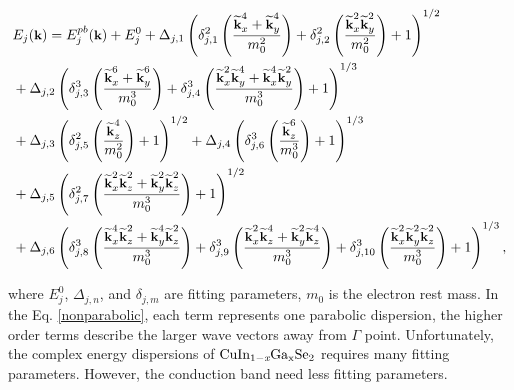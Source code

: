 \documentclass[a4paper, 12pt, titlepage,oneside,drop]{kthesis}
\begin{document}
\begin{equation}\label{nonparabolic}
\begin{split}
& \small E_j(\textbf{k}) = E_{j}^{pb}(\textbf{k}) + E_j^0 + \Delta_{j,1} \left( \delta_{j,1}^2 \left( \frac{\widetilde{\textbf{k}}_{x}^{4}+\widetilde{ \textbf{k}}_{y}^{4}}{m_{0}^{2}} \right) + \delta_{j,2}^2 \left( \frac{\widetilde{\textbf{k}}_{x}^{2}\widetilde{\textbf{k}}_{y}^{2}}{m_{0}^2} \right) + 1 \right)^{1/2} \\
& \small + \Delta_{j,2} \left( \delta_{j,3}^3 \left( \frac{\widetilde{\textbf{k}}_{x}^{6}+\widetilde{ \textbf{k}}_{y}^{6}}{m_{0}^{3}} \right) + \delta_{j,4}^3 \left( \frac{\widetilde{\textbf{k}}_{x}^{2}\widetilde{\textbf{k}}_{y}^{4} + \widetilde{\textbf{k}}_{x}^{4}\widetilde{\textbf{k}}_{y}^{2}}{m_{0}^3} \right) + 1 \right)^{1/3} \\
& \small + \Delta_{j,3} \left( \delta_{j,5}^2 \left( \frac{\widetilde{\textbf{k}}_{z}^{4}}{m_0^2} \right) + 1 \right)^{1/2} + \Delta_{j,4} \left( \delta_{j,6}^3 \left( \frac{\widetilde{\textbf{k}}_{z}^{6}}{m_0^3} \right) + 1 \right)^{1/3} \\
& \small + \Delta_{j,5} \left( \delta_{j,7}^2 \left( \frac{\widetilde{\textbf{k}}_{x}^{2}\widetilde{\textbf{k}}_{z}^{2} + \widetilde{\textbf{k}}_{y}^{2}\widetilde{\textbf{k}}_{z}^{2}}{m_{0}^3} \right) + 1 \right)^{1/2} \\
& \small + \Delta_{j,6} \left( \delta_{j,8}^3 \left( \frac{\widetilde{\textbf{k}}_{x}^{4}\widetilde{\textbf{k}}_{z}^{2} + \widetilde{\textbf{k}}_{y}^{4}\widetilde{\textbf{k}}_{z}^{2}}{m_{0}^3} \right) + \delta_{j,9}^3 \left( \frac{\widetilde{\textbf{k}}_{x}^{2}\widetilde{\textbf{k}}_{z}^{4} + \widetilde{\textbf{k}}_{y}^{2}\widetilde{\textbf{k}}_{z}^{4}}{m_{0}^3} \right) + \delta_{j,10}^3 \left( \frac{\widetilde{\textbf{k}}_{x}^{2}\widetilde{\textbf{k}}_{y}^{2}\widetilde{\textbf{k}}_{z}^{2}}{m_{0}^3} \right) +1 \right)^{1/3},
\end{split}\end{equation}

where  $E_j^0$, $\Delta_{j,n}$, and $\delta_{j,m}$ are fitting parameters, ${m_0}$ is the electron rest mass. In the Eq. \ref{nonparabolic}, each term represents one
parabolic dispersion, the higher order terms describe the larger wave vectors away from $\Gamma$ point. Unfortunately, the complex
energy dispersions of $\mathrm { CuIn_{1-\textit{x}}Ga_{x}Se_2}$ requires many fitting parameters. However, the conduction band need less fitting parameters.

 \newpage
\end{document}
